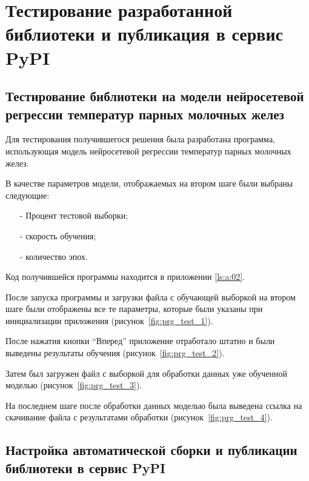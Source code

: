 \chapter{Тестирование разработанной библиотеки и публикация в сервис PyPI}\vspace{-7mm}

\section{Тестирование библиотеки на модели нейросетевой регрессии температур парных молочных желез}
Для тестирования получившегося решения была разработана программа, использующая модель нейросетевой регрессии температур парных молочных желез.

В качестве параметров модели, отображаемых на втором шаге были выбраны следующие:
\begin{itemize}
	\item[-] Процент тестовой выборки;
	\item[-] скорость обучения;
	\item[-] количество эпох.
\end{itemize}


Код получившейся программы находится в приложении \ref{ls:a:02}.


После запуска программы и загрузки файла с обучающей выборкой на втором шаге были отображены все те параметры, которые были указаны при инициализации приложения (рисунок~\ref{fig:prg_test_1}).




После нажатия кнопки “Вперед” приложение отработало штатно и были выведены результаты обучения (рисунок~\ref{fig:prg_test_2}).



Затем был загружен файл с выборкой для обработки данных уже обученной моделью (рисунок~\ref{fig:prg_test_3}).


На последнем шаге после обработки данных моделью была выведена ссылка на скачивание файла с результатами обработки (рисунок~\ref{fig:prg_test_4}).


\section{Настройка автоматической сборки и публикации библиотеки в сервис PyPI}

